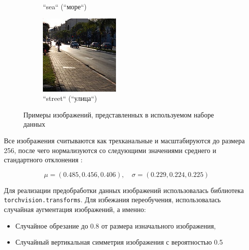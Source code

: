 \begin{figure}[htbp]
\begin{subfigure}[b]{0.3\textwidth}
    \caption{``sea`` (``море``)}
    \label{fig:intel-multiclass-sea}
  \end{subfigure}
  \hfill
  \begin{subfigure}[b]{0.3\textwidth}
    \centering
    \includegraphics[width=\textwidth]{images/research/dataset/street.jpg}
    \caption{``street`` (``улица``)}
    \label{fig:intel-multiclass-street}
  \end{subfigure}

  \caption{Примеры изображений, представленных в используемом наборе данных}
  \label{fig:intel-multiclass-all}
\end{figure}


Все изображения считываются как трехканальные и масштабируются до размера 256, после чего нормализуются со следующими значениями среднего и стандартного отклонения \cite{torchvision_normalization}: 

$$
\mu = (0.485, 0.456, 0.406), \quad \sigma = (0.229, 0.224, 0.225)
$$

Для реализации предобработки данных изображений использовалась библиотека \texttt{torchvision.transforms}. Для избежания переобучения, использовалась случайная аугментация изображений, а именно:

\begin{itemize}
    \item Случайное обрезание до $0.8$ от размера изначального изображения,
    \item Случайный вертикальная симметрия изображения с вероятностью 0.5
\end{itemize}

